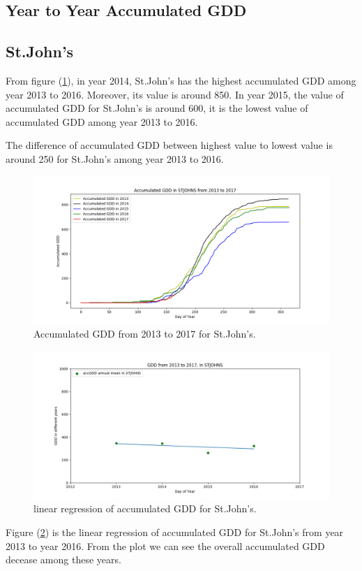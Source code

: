 \documentclass[12pt]{article}
\begin{document}
\subsection{ \bf Year to Year Accumulated GDD }
\subsection{St.John's}

From figure (\ref{9}), in year 2014, St.John's has the highest accumulated GDD among year 2013 to 2016. Moreover, its value is around 850. In year 2015, the value of accumulated GDD for St.John's is around 600, it is the lowest value of accumulated GDD among year 2013 to 2016. 

The difference of accumulated GDD between highest value to lowest value is around 250 for St.John's among year 2013 to 2016.

\begin{center}
\begin{figure}[H]
\includegraphics[width=5.25in]{../Plot/STJOHNS/accGDD_2013_2017.png}

\caption{Accumulated GDD from 2013 to 2017 for St.John's.}
\label{9}
\end{figure}
\end{center}

\begin{center}
\begin{figure}[H]
\includegraphics[width=5.25in]{../Plot/STJOHNS/GDD_LinearRegression_STJOHNS.png}
\caption{linear regression of accumulated GDD for  St.John's.}
\label{10}
\end{figure}
\end{center}
Figure (\ref{10}) is the linear regression of accumulated GDD for St.John's from year 2013 to year 2016. From the plot we can see the overall accumulated GDD decease among these years.
\end{document}
